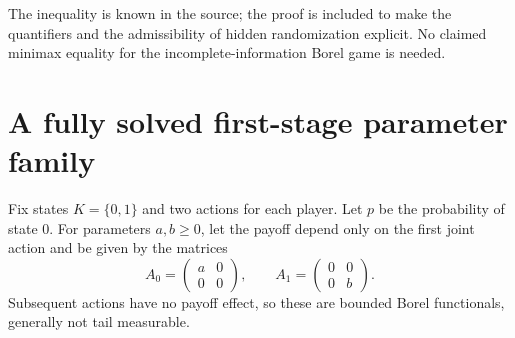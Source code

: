 \documentclass[11pt]{article}
\theoremstyle{definition}
\begin{document}
The inequality is known in the source; the proof is included to make the quantifiers and the admissibility of hidden randomization explicit. No claimed minimax equality for the incomplete-information Borel game is needed.

\section*{A fully solved first-stage parameter family}
Fix states $K=\{0,1\}$ and two actions for each player. Let $p$ be the probability of state $0$. For parameters $a,b\ge0$, let the payoff depend only on the first joint action and be given by the matrices
\[
 A_0=\begin{pmatrix}a&0\\0&0\end{pmatrix},\qquad
 A_1=\begin{pmatrix}0&0\\0&b\end{pmatrix}.
\]
Subsequent actions have no payoff effect, so these are bounded Borel functionals, generally not tail measurable.
\end{document}
